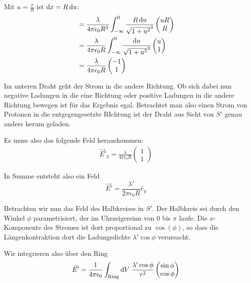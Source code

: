 \documentclass[a4paper,german,12pt,smallheadings]{scrartcl}
\begin{document}
Mit $u = \frac{x}{R}$ ist $\dif x = R \dif u$:
\begin{align*}
  &= \frac{\lambda}{4 \pi \epsilon_0 R^3} \int_{-\infty}^0
  \frac{R \dif u}{\sqrt{1 + u^2}^3} \begin{pmatrix} u R \\ R \end{pmatrix} \\
  &= \frac{\lambda}{4 \pi \epsilon_0 R} \int_{-\infty}^0
  \frac{\dif u}{\sqrt{1 + u^2}^3} \begin{pmatrix} u \\ 1 \end{pmatrix} \\
  &= \frac{\lambda}{4 \pi \epsilon_0 R} \begin{pmatrix} -1 \\ 1 \end{pmatrix}
\end{align*}


Im unteren Draht geht der Strom in die andere Richtung. Ob sich dabei nun
negative Ladungen in die eine Richtung oder positive Ladungen in die andere
Richtung bewegen ist für das Ergebnis egal. Betrachtet man also einen Strom von
Protonen in die entgegengesetzte RIchtung ist der Draht aus Sicht von $S'$
genau anders herum geladen.

Es muss also das folgende Feld herauskommen:
\begin{align*}
  \vec{E}'_2 = \frac{\lambda}{4 \pi \epsilon_0 R} \begin{pmatrix} 1 \\ 1 \end{pmatrix}
\end{align*}

In Summe entsteht also ein Feld
\begin{equation}
  \vec{E}' = \frac{\lambda'}{2 \pi \epsilon_0 R} \hat{e}_y
\end{equation}

Betrachten wir nun das Feld des Halbkreises in $S'$. Der Halbkreis sei durch
den Winkel $\phi$ parametrisiert, der im Uhrzeigersinn von $0$ bis $\pi$ laufe.
Die $x$-Komponente des Stromes ist dort proportional zu $\cos(\phi)$, so dass
die Längenkontraktion dort die Ladungsdichte $\lambda' \cos \phi$ verursacht.

Wir integrieren also über den Ring
\begin{equation}
  \vec{E}' = \frac{1}{4 \pi \epsilon_0} \int_\text{Ring} \dif V \;
  \frac{\lambda' \cos \phi}{r^2} \begin{pmatrix} \sin \phi \\ \cos \phi \end{pmatrix}
\end{equation}
\end{document}

